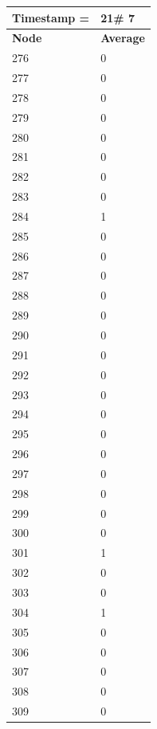 \begin{tabular}{|l||l|}
\hline
\textbf{Timestamp =} & \textbf{21}\# 7\\\hline
	\textbf{Node} & \textbf{Average} \\ \hline
\hline
	276 & 0 \\ \hline
	277 & 0 \\ \hline
	278 & 0 \\ \hline
	279 & 0 \\ \hline
	280 & 0 \\ \hline
	281 & 0 \\ \hline
	282 & 0 \\ \hline
	283 & 0 \\ \hline
	284 & 1 \\ \hline
	285 & 0 \\ \hline
	286 & 0 \\ \hline
	287 & 0 \\ \hline
	288 & 0 \\ \hline
	289 & 0 \\ \hline
	290 & 0 \\ \hline
	291 & 0 \\ \hline
	292 & 0 \\ \hline
	293 & 0 \\ \hline
	294 & 0 \\ \hline
	295 & 0 \\ \hline
	296 & 0 \\ \hline
	297 & 0 \\ \hline
	298 & 0 \\ \hline
	299 & 0 \\ \hline
	300 & 0 \\ \hline
	301 & 1 \\ \hline
	302 & 0 \\ \hline
	303 & 0 \\ \hline
	304 & 1 \\ \hline
	305 & 0 \\ \hline
	306 & 0 \\ \hline
	307 & 0 \\ \hline
	308 & 0 \\ \hline
	309 & 0 \\ \hline
\end{tabular}

